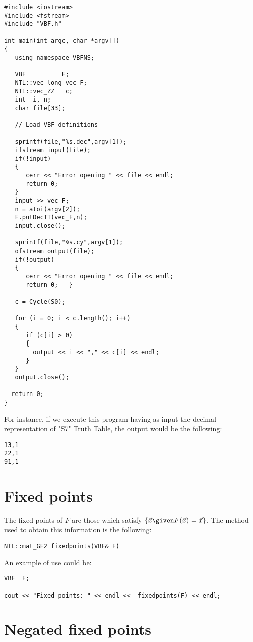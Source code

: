 \begin{verbatim}
#include <iostream>
#include <fstream>
#include "VBF.h"

int main(int argc, char *argv[])
{
   using namespace VBFNS;

   VBF          F;
   NTL::vec_long vec_F;
   NTL::vec_ZZ   c;
   int  i, n;
   char file[33];

   // Load VBF definitions

   sprintf(file,"%s.dec",argv[1]);
   ifstream input(file);
   if(!input)
   {
      cerr << "Error opening " << file << endl;
      return 0;
   }
   input >> vec_F;
   n = atoi(argv[2]);
   F.putDecTT(vec_F,n);
   input.close();

   sprintf(file,"%s.cy",argv[1]);
   ofstream output(file);
   if(!output)
   {
      cerr << "Error opening " << file << endl;
      return 0;   }

   c = Cycle(S0);

   for (i = 0; i < c.length(); i++)
   {
      if (c[i] > 0)
      {
        output << i << "," << c[i] << endl;
      }
   }
   output.close();

  return 0;
}
\end{verbatim}

For instance, if we execute this program having as input the decimal representation of "S7" Truth Table, the output would be the following:

\begin{verbatim}
13,1
22,1
91,1
\end{verbatim}

\section{Fixed points}

The fixed points of $F$ are those which satisfy $\{ \vec{x} \given F(\vec{x})=\vec{x} \}$. The method used to obtain this information is the following:

\begin{verbatim}
NTL::mat_GF2 fixedpoints(VBF& F)
\end{verbatim}

An example of use could be:

\begin{verbatim}
VBF  F;

cout << "Fixed points: " << endl <<  fixedpoints(F) << endl;
\end{verbatim}

\section{Negated fixed points}

